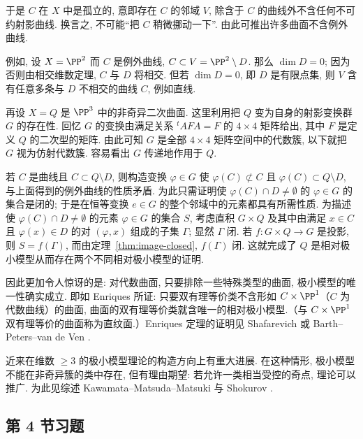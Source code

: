 于是 $C$ 在 $X$ 中是孤立的, 意即存在 $C$ 的邻域 $V$, 除含于 $C$ 的曲线外不含任何不可约射影曲线. 换言之, 不可能``把 $C$ 稍微挪动一下''. 由此可推出许多曲面不含例外曲线.

例如, 设 $X = \PP^2$ 而 $C$ 是例外曲线, $C \subset V = \PP^2 \setminus D$. 那么 $\dim D = 0$; 因为否则由相交维数定理, $C$ 与 $D$ 将相交. 但若 $\dim D = 0$, 即 $D$ 是有限点集, 则 $V$ 含有任意多条与 $D$ 不相交的曲线 $C$, 例如直线.

再设 $X = Q$ 是 $\PP^3$ 中的非奇异二次曲面. 这里利用把 $Q$ 变为自身的射影变换群 $G$ 的存在性. 回忆 $G$ 的变换由满足关系 ${}^t A F A = F$ 的 $4 \times 4$ 矩阵给出, 其中 $F$ 是定义 $Q$ 的二次型的矩阵. 由此可知 $G$ 是全部 $4 \times 4$ 矩阵空间中的代数簇, 以下就把 $G$ 视为仿射代数簇. 容易看出 $G$ 传递地作用于 $Q$.

若 $C$ 是曲线且 $C \subset Q \setminus D$, 则构造变换 $\varphi \in G$ 使 $\varphi(C) \not\subset C$ 且 $\varphi(C) \subset Q \setminus D$, 与上面得到的例外曲线的性质矛盾. 为此只需证明使 $\varphi(C) \cap D \ne \emptyset$ 的 $\varphi \in G$ 的集合是闭的; 于是在恒等变换 $e \in G$ 的整个邻域中的元素都具有所需性质. 为描述使 $\varphi(C) \cap D \ne \emptyset$ 的元素 $\varphi \in G$ 的集合 $S$, 考虑直积 $G \times Q$ 及其中由满足 $x \in C$ 且 $\varphi(x) \in D$ 的对 $(\varphi, x)$ 组成的子集 $\Gamma$; 显然 $\Gamma$ 闭. 若 $f: G \times Q \to G$ 是投影, 则 $S = f(\Gamma)$, 而由定理~\ref{thm:image-closed}, $f(\Gamma)$ 闭. 这就完成了 $Q$ 是相对极小模型从而存在两个不同相对极小模型的证明.

因此更加令人惊讶的是: 对代数曲面, 只要排除一些特殊类型的曲面, 极小模型的唯一性确实成立. 即如 Enriques 所证: 只要双有理等价类不含形如 $C \times \PP^1$（$C$ 为代数曲线）的曲面, 曲面的双有理等价类就含唯一的相对极小模型.（与 $C \times \PP^1$ 双有理等价的曲面称为直纹面.）Enriques 定理的证明见 Shafarevich \cite[第 II 章]{shafarevich1994} 或 Barth--Peters--van de Ven \cite{barth1984}.

近来在维数 $\ge 3$ 的极小模型理论的构造方向上有重大进展. 在这种情形, 极小模型不能在非奇异簇的类中存在, 但有理由期望: 若允许一类相当受控的奇点, 理论可以推广. 为此见综述 Kawamata--Matsuda--Matsuki \cite{kmm1987} 与 Shokurov \cite{shokurov1985}.

\subsection{第 4 节习题}

